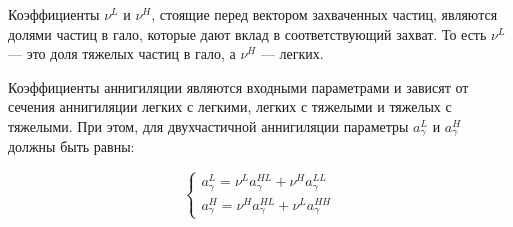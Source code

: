 Коэффициенты $\nu^L$ и $\nu^H$, стоящие перед вектором захваченных частиц, являются долями частиц в гало, которые дают вклад в соответствующий захват. То есть $\nu^L$ --- это доля тяжелых частиц в гало, а $\nu^H$ --- легких. 

Коэффициенты аннигиляции являются входными параметрами и зависят от сечения аннигиляции легких с легкими, легких с тяжелыми и тяжелых с тяжелыми. При этом, для двухчастичной аннигиляции параметры $a_{\gamma}^{L}$ и $a_{\gamma}^{H}$ должны быть равны:

\begin{equation}
	\label{eq:require_a_gamma}
	\begin{cases}
		a_{\gamma}^{L} = \nu^L a_{\gamma}^{HL} + \nu^H a_{\gamma}^{LL}\\
		a_{\gamma}^{H} = \nu^H a_{\gamma}^{HL} + \nu^L a_{\gamma}^{HH}
	\end{cases}
\end{equation}